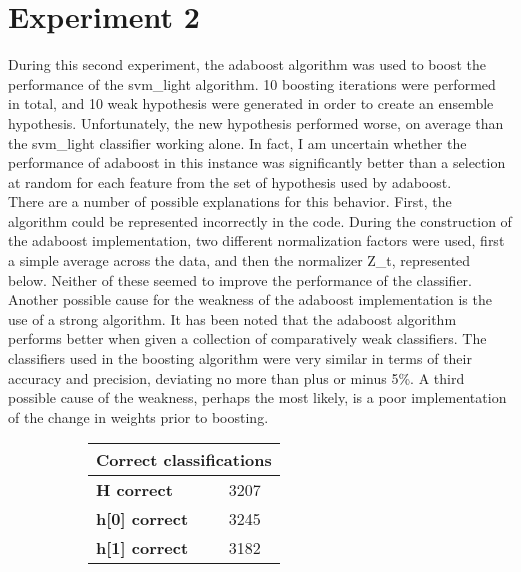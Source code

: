 \documentclass[titlepage,11pt]{article}
\begin{document}
\section[5]{Experiment 2} {
\vspace{2pt} \hspace{2pt}During this second experiment, the adaboost algorithm was used to boost the performance of the svm\_light algorithm. 10 boosting iterations were performed in total, and 10 weak hypothesis were generated in order to create an ensemble hypothesis. Unfortunately, the new hypothesis performed worse, on average than the svm\_light classifier working alone. In fact, I am uncertain whether the performance of adaboost in this instance was significantly better than a selection at random for each feature from the set of hypothesis used by adaboost. \\
\vspace{2pt} \hspace{2pt}There are a number of possible explanations for this behavior. First, the algorithm could be represented incorrectly in the code. During the construction of the adaboost implementation, two different normalization factors were used, first a simple average across the data, and then the normalizer Z\_t, represented below. Neither of these seemed to improve the performance of the classifier. Another possible cause for the weakness of the adaboost implementation is the use of a strong algorithm. It has been noted that the adaboost algorithm performs better when given a collection of comparatively weak classifiers. The classifiers used in the boosting algorithm were very similar in terms of their accuracy and precision, deviating no more than plus or minus 5\%. A third possible cause of the weakness, perhaps the most likely, is a poor implementation of the change in weights prior to boosting. \\
\vspace{0.5pt}
\begin{figure}[h]
\centering
    \begin{subfigure}[h]{0.3\textwidth}
        \centering
        \begin{tabular}{|l|l|}
        \hline
        \multicolumn{2}{|c|}{\textbf{Correct classifications}}\\
        \hline
        \textbf{ H correct } & 3207 \\
        \textbf{ h[0] correct } & 3245 \\
        \textbf{ h[1] correct } & 3182 \\

\end{tabular}
\end{subfigure}
\end{figure}}
\end{document}
